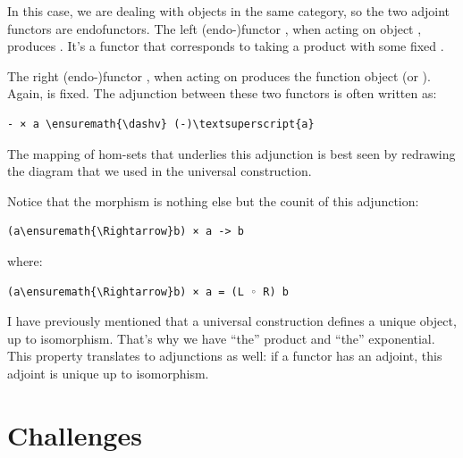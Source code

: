 In this case, we are dealing with objects in the same category, so the
two adjoint functors are endofunctors. The left (endo-)functor
, when acting on object , produces .
It's a functor that corresponds to taking a product with some fixed
.

The right (endo-)functor , when acting on  produces
the function object  (or ). Again,  is
fixed. The adjunction between these two functors is often written as:

\begin{Verbatim}[commandchars=\\\{\}]
- × a \ensuremath{\dashv} (-)\textsuperscript{a}
\end{Verbatim}
The mapping of hom-sets that underlies this adjunction is best seen by
redrawing the diagram that we used in the universal construction.

\begin{figure}[H]
\centering
{}
\end{figure}

\noindent
Notice that the  morphism is nothing else but the counit of
this adjunction:

\begin{Verbatim}[commandchars=\\\{\}]
(a\ensuremath{\Rightarrow}b) × a -> b
\end{Verbatim}
where:

\begin{Verbatim}[commandchars=\\\{\}]
(a\ensuremath{\Rightarrow}b) × a = (L ◦ R) b
\end{Verbatim}
I have previously mentioned that a universal construction defines a
unique object, up to isomorphism. That's why we have ``the'' product and
``the'' exponential. This property translates to adjunctions as well: if
a functor has an adjoint, this adjoint is unique up to isomorphism.

\section{Challenges}\label{challenges}

